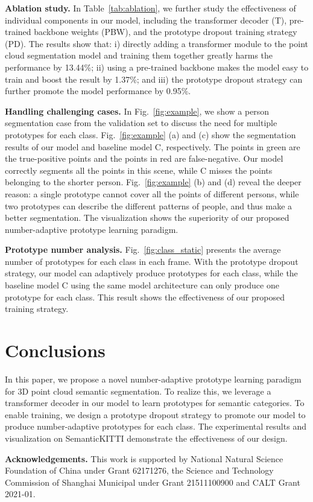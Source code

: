 \documentclass[runningheads]{llncs}
\begin{document}
\textbf{Ablation study.} In Table~\ref{tab:ablation}, we further study the effectiveness of individual components in our model, including the transformer decoder (T), pre-trained backbone weights (PBW), and the prototype dropout training strategy (PD). The results show that: i) directly adding a transformer module to the point cloud segmentation model and training them together greatly harms the performance by 13.44\%; ii) using a pre-trained backbone makes the model easy to train and boost the result by 1.37\%; and iii) the prototype dropout strategy can further promote the model performance
by 0.95\%. 

\textbf{Handling challenging cases.} In Fig.~\ref{fig:example}, we show a person segmentation case from the validation set to discuss the need for multiple prototypes for each class. Fig.~\ref{fig:example} (a) and (c) show the segmentation results of our model and baseline model C, respectively. The points in green are the true-positive points and the points in red are false-negative. Our model correctly segments all the points in this scene, while C misses the points belonging to the shorter person. Fig.~\ref{fig:example} (b) and (d) reveal the deeper 
reason: a single prototype cannot cover all the points of different persons, while two prototypes can describe the different patterns of people, and thus make a better segmentation. The visualization shows the superiority of our proposed number-adaptive prototype learning paradigm. 

\textbf{Prototype number analysis.}  Fig.~\ref{fig:class_static} presents the average number of prototypes for each class in each frame. With the prototype dropout strategy, our model can adaptively produce prototypes for each class, while the baseline model C using the same model architecture can only produce one prototype for each class. This result shows the effectiveness of our proposed training strategy. 


\section{Conclusions}
In this paper, we propose a novel number-adaptive prototype learning paradigm for 3D point cloud semantic segmentation. To realize this, we leverage a transformer decoder in our model to learn prototypes for semantic categories. To enable training, we design a prototype dropout strategy to promote our model to produce number-adaptive prototypes for each class. The experimental results and visualization on SemanticKITTI demonstrate the effectiveness of our design.


\noindent\textbf{Acknowledgements.} This work is  supported by National Natural Science Foundation of China
under Grant 62171276, the Science and Technology Commission of Shanghai Municipal under Grant 21511100900 and CALT Grant 2021-01.
\clearpage


\end{document}
